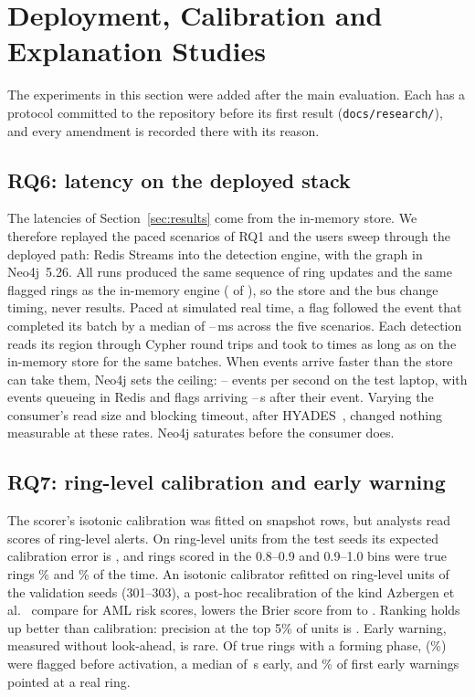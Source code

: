 \section{Deployment, Calibration and Explanation Studies}
\label{sec:phase2}
The experiments in this section were added after the main evaluation. Each has
a protocol committed to the repository before its first result
(\texttt{docs/research/}), and every amendment is recorded there with its
reason.

\subsection{RQ6: latency on the deployed stack}
The latencies of Section~\ref{sec:results} come from the in-memory store. We
therefore replayed the paced scenarios of RQ1 and the users sweep through
the deployed path: Redis Streams into the detection engine, with the graph in
Neo4j~5.26. All \EightRuns{} runs produced the same sequence of ring updates and
the same flagged rings as the in-memory engine (\EightSame{} of \EightRuns{}),
so the store and the bus change timing, never results. Paced at simulated real
time, a flag followed the event that completed its batch by a median of
\EightFlagLo{}--\EightFlagHi{}\,ms across the five scenarios. Each detection
reads its region through Cypher round trips and took \EightSlowLo{} to
\EightSlowHi{} times as long as on the in-memory store for the same batches.
When events arrive faster than the store can take them, Neo4j sets the ceiling:
\EightTputLo{}--\EightTputHi{} events per second on the test laptop, with events
queueing in Redis and flags arriving \EightBurstLo{}--\EightBurstHi{}\,s after
their event. Varying the consumer's read size and blocking timeout, after
HYADES~\cite{bora2026hyades}, changed nothing measurable at these rates. Neo4j
saturates before the consumer does.

\subsection{RQ7: ring-level calibration and early warning}
The scorer's isotonic calibration was fitted on snapshot rows, but analysts read
scores of ring-level alerts. On \TenUnits{} ring-level units from the test seeds
its expected calibration error is \TenEce{}, and rings scored in the 0.8--0.9
and 0.9--1.0 bins were true rings \TenBinEight\% and \TenBinNine\% of the time.
An isotonic calibrator \cite{zadrozny2002transforming} refitted on
ring-level units of the validation seeds (301--303), a post-hoc recalibration
of the kind Azbergen et al.~\cite{azbergen2026calibration} compare for AML risk
scores, lowers the Brier score from \TenBrier{} to
\TenBrierRefit{}. Ranking holds up better than calibration: precision at the top
5\% of units is \TenPAtFive{}. Early warning, measured without look-ahead, is
rare. Of \ElevenEligible{} true rings with a forming phase, \ElevenWarned{}
(\ElevenShare\%) were flagged before activation, a median of \ElevenLead{}\,s
early, and \ElevenPrecision\% of first early warnings pointed at a real ring.

